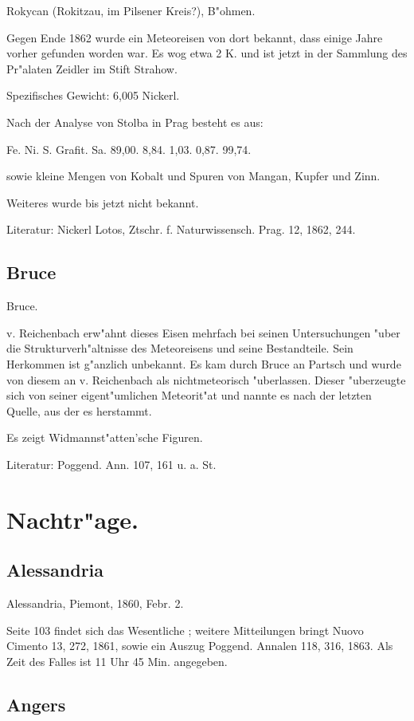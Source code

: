 \documentclass[a4paper, 11pt, oneside]{article}
\begin{document}
Rokycan (Rokitzau, im Pilsener Kreis?), B"ohmen.

Gegen Ende 1862 wurde ein Meteoreisen von dort bekannt, dass einige Jahre vorher gefunden worden war. Es wog etwa 2 K. und ist jetzt in der Sammlung des Pr"alaten Zeidler im Stift Strahow.

Spezifisches Gewicht: 6,005 Nickerl.

Nach der Analyse von Stolba in Prag besteht es aus:

Fe. Ni. S. Grafit. Sa.  
89,00. 8,84. 1,03. 0,87. 99,74.

sowie kleine Mengen von Kobalt und Spuren von Mangan, Kupfer und Zinn.

Weiteres wurde bis jetzt nicht bekannt.

Literatur: Nickerl Lotos, Ztschr. f. Naturwissensch. Prag. 12, 1862, 244.

\subsection{Bruce}

Bruce.

v. Reichenbach erw"ahnt dieses Eisen mehrfach bei seinen Untersuchungen "uber die Strukturverh"altnisse des Meteoreisens und seine Bestandteile. Sein Herkommen ist g"anzlich unbekannt. Es kam durch Bruce an Partsch und wurde von diesem an v. Reichenbach als nichtmeteorisch "uberlassen. Dieser "uberzeugte sich von seiner eigent"umlichen Meteorit"at und nannte es nach der letzten Quelle, aus der es herstammt.

Es zeigt Widmannst"atten'sche Figuren.

Literatur: Poggend. Ann. 107, 161 u. a. St.

\section{Nachtr"age.}

\subsection{Alessandria}

Alessandria, Piemont, 1860, Febr. 2.

Seite 103 findet sich das Wesentliche ; weitere Mitteilungen bringt Nuovo Cimento 13, 272, 1861, sowie ein Auszug Poggend. Annalen 118, 316, 1863. Als Zeit des Falles ist 11 Uhr 45 Min. angegeben.

\subsection{Angers}
\end{document}

